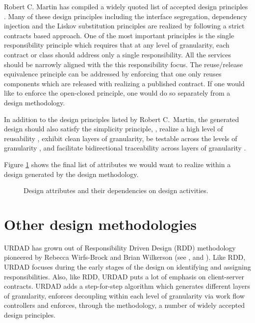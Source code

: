 \documentclass{IOS-Book-Article}
\begin{document}
Robert C. Martin has compiled a widely quoted list of accepted design principles \cite{martin:agileSoftwareDevelopment}.
Many of these design principles including the interface segregation, dependency injection and the Liskov substitution
principles are realized by following a strict contracts based approach.
One of the most important principles is the single responsibility principle which requires that at any level of
granularity, each contract or class should address only a single responsibility. All the services should be narrowly aligned with the
this responsibility focus. The reuse/release equivalence principle can be addressed by enforcing that one only reuses
components which are released with realizing a published contract. If one would like to enforce the open-closed principle, one would do so
separately from a design methodology.

In addition to the design principles listed by Robert C.\ Martin, 
the generated design should also satisfy the simplicity principle, \cite{wirfs-brock:designSimplicity},
realize a high level of reusability \cite{lenz:softwareReuse},
exhibit clean layers of granularity, \cite{martin:agileSoftwareDevelopment, artus:soaRealization}
be testable across the levels of granularity \cite{voas:softwareTestability},
and facilitate bidirectional traceability across layers of granularity 
\cite{dick:designTraceability, aizenbud-reshef:modelTraceability}.

Figure \ref{fig:designActivities} shows  the final list of attributes we would want to 
realize within a design generated by the design methodology. 

\begin{figure}
  \centering
  \caption{Design attributes and their dependencies on design activities.}
  \label{fig:designActivities}
\end{figure}



\section{Other design methodologies}

URDAD has grown out of Responsibility Driven Design (RDD) methodology pioneered by Rebecca Wirfs-Brock and Brian Wilkerson (see \cite{wirfs-brock:responsibilityDrivenApproach},  and \cite{wirfs-brock:objectDesign} \cite{wirfs-brock:designSimplicity}). Like RDD, URDAD focuses during the early stages of the design on identifying and assigning responsibilities. Also, like RDD, URDAD puts a lot of emphasis on client-server contracts. URDAD adds a step-for-step algorithm which generates different layers of granularity, enforces decoupling within each level of granularity via work flow controllers and enforces, through the
methodology, a number of widely accepted design principles.
\end{document}
